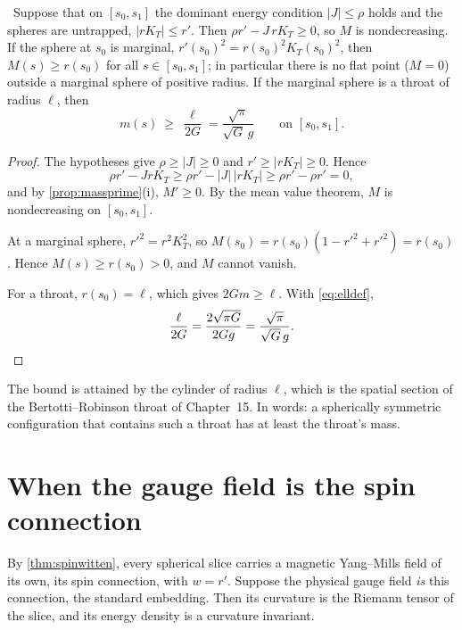 \begin{theorem}\label{thm:penrose}\ver\
Suppose that on $[s_0,s_1]$ the dominant energy condition $|J|\le\rho$ holds and the spheres are untrapped, $|rK_T|\le r'$. Then $\rho r'-J\,rK_T\ge0$, so $M$ is nondecreasing. If the sphere at $s_0$ is marginal, $r'(s_0)^2=r(s_0)^2K_T(s_0)^2$, then $M(s)\ge r(s_0)$ for all $s\in[s_0,s_1]$; in particular there is no flat point ($M=0$) outside a marginal sphere of positive radius. If the marginal sphere is a throat of radius $\ell$, then
\[
m(s)\ \ge\ \frac{\ell}{2G}=\frac{\sqrt\pi}{\sqrt G\,g}\qquad\text{on }[s_0,s_1].
\]
\end{theorem}
\begin{proof}
The hypotheses give $\rho\ge|J|\ge0$ and $r'\ge|rK_T|\ge0$. Hence
\[
\rho r'-JrK_T\ge\rho r'-|J|\,|rK_T|\ge\rho r'-\rho r'=0 ,
\]
and by \cref{prop:massprime}(i), $M'\ge0$. By the mean value theorem, $M$ is nondecreasing on $[s_0,s_1]$.

At a marginal sphere, $r'^2=r^2K_T^2$, so $M(s_0)=r(s_0)(1-r'^2+r'^2)=r(s_0)$. Hence $M(s)\ge r(s_0)>0$, and $M$ cannot vanish.

For a throat, $r(s_0)=\ell$, which gives $2Gm\ge\ell$. With \eqref{eq:elldef},
\[
\frac\ell{2G}=\frac{2\sqrt{\pi G}}{2Gg}=\frac{\sqrt\pi}{\sqrt G\,g}.\qedhere
\]
\end{proof}


The bound is attained by the cylinder of radius $\ell$, which is the spatial section of the Bertotti--Robinson throat of Chapter~15. In words: a spherically symmetric configuration that contains such a throat has at least the throat's mass.

\section{When the gauge field is the spin connection}

By \cref{thm:spinwitten}, every spherical slice carries a magnetic Yang--Mills field of its own, its spin connection, with $w=r'$. Suppose the physical gauge field \emph{is} this connection, the standard embedding. Then its curvature is the Riemann tensor of the slice, and its energy density is a curvature invariant.

